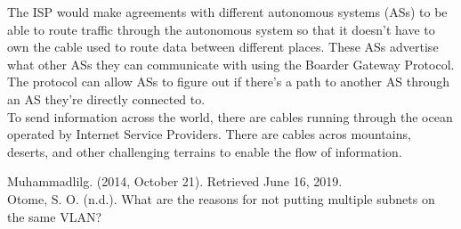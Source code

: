 The ISP would make agreements with different autonomous systems (ASs) to be able to route traffic through the autonomous system so that it doesn’t have to own the cable used to route data between different places. These ASs advertise what other ASs they can communicate with using the Boarder Gateway Protocol. The protocol can allow ASs to figure out if there’s a path to another AS through an AS they’re directly connected to. \\

To send information across the world, there are cables running through the ocean operated by Internet Service Providers. There are cables acros mountains, deserts, and other challenging terrains to enable the flow of information. \\


Muhammadlilg. (2014, October 21). Retrieved June 16, 2019. \\

Otome, S. O. (n.d.). What are the reasons for not putting multiple subnets on the same VLAN?  \\

